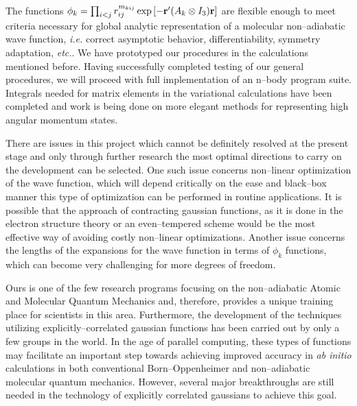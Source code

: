 The functions $\phi _k = 
\prod_{i<j}r_{ij}^{m_{kij}}\exp \left[ -{\bf r}^{\prime%
}(A_k\otimes I_3){\bf r}\right]$
are flexible enough to meet criteria necessary for global analytic
representation of a molecular non--adiabatic wave function, {\it i.e.} 
correct
asymptotic behavior, differentiability, symmetry adaptation, {\it etc.}. 
We have prototyped our procedures in the calculations mentioned before. 
Having successfully completed testing of our general procedures, we will
proceed with full implementation of an 
n--body program suite. 
Integrals needed for matrix elements in
the variational calculations have been 
completed and work is being done on
more elegant methods for representing 
high angular momentum states.

There are issues in this project which cannot be definitely
resolved at the present stage and only through further research 
the most optimal directions to carry on the development can be
selected. One such issue concerns non--linear optimization of the
wave function, which will depend 
critically on the ease and black--box
manner this type of optimization 
can be performed in routine applications.
It is possible that the approach of 
contracting gaussian functions,
as it is done in the electron structure theory 
or an even--tempered scheme 
would be the most
effective way of avoiding costly non--linear optimizations.
Another issue concerns the lengths of the expansions for the
wave function in terms of $\phi_k$
functions, which can become very challenging for more degrees
of freedom.



Ours is one of the few research 
programs focusing on the non--adiabatic 
Atomic and Molecular Quantum Mechanics
and, therefore, provides a unique 
training place for scientists in this area.  
Furthermore, the development of the techniques 
utilizing explicitly--correlated gaussian functions
has been carried out by only a few groups in the world.  
In the age of parallel computing, these
types of functions may facilitate an important 
step towards achieving improved accuracy in 
{\it ab initio} calculations in both conventional 
Born--Oppenheimer and non--adiabatic 
molecular quantum mechanics.
However, several major breakthroughs are still needed 
in the technology of explicitly correlated gaussians
to achieve this goal.


\pagebreak


